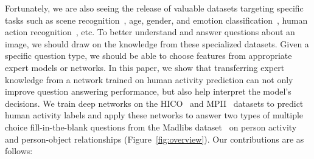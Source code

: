 \documentclass[runningheads]{llncs}
\begin{document}

Fortunately, we are also seeing the release of valuable datasets targeting specific tasks such as scene recognition~\cite{zhou2014learning}, age, gender, and emotion classification~\cite{levi2015age,levi2015emotion}, human action recognition~\cite{maji2011action,chao2015hico,pishchulin2014fine}, etc. To better understand and answer questions about an image, we should draw on the knowledge from these specialized datasets. Given a specific question type, we should be able to choose features from appropriate expert models or networks. 
In this paper, we show that transferring expert knowledge from a network trained on human activity prediction can not only improve question answering performance, but also help interpret the model's decisions. We train deep networks on the HICO~\cite{chao2015hico} and MPII~\cite{pishchulin2014fine} datasets to predict human activity labels and apply these networks to answer two types of multiple choice fill-in-the-blank questions from the Madlibs dataset~\cite{yu2015visual} on person activity and person-object relationships (Figure~\ref{fig:overview}). Our contributions are as follows:
\end{document}

